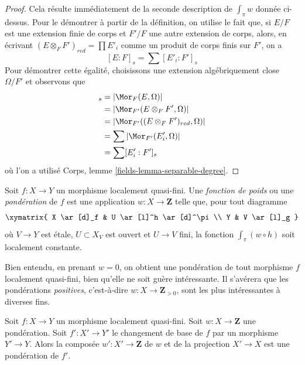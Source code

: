 \begin{proof}
Cela résulte immédiatement de la seconde description de $\int_\pi w$
donnée ci-dessus. Pour le démontrer à partir de la définition, on utilise le fait que, si
$E/F$ est une extension finie de corps et $F'/F$ une autre extension de corps,
alors, en écrivant $(E \otimes_F F')_{red} = \prod E'_i$ comme un produit de corps
finis sur $F'$, on a
$$
[E : F]_s = \sum [E'_i : F']_s
$$
Pour démontrer cette égalité, choisissons une extension algébriquement close
$\Omega/F'$ et observons que
\begin{align*}
[E : F]_s
& =
|\Mor_F(E, \Omega)| \\
& =
|\Mor_{F'}(E \otimes_F F', \Omega)| \\
& =
|\Mor_{F'}((E \otimes_F F')_{red}, \Omega)| \\
& =
\sum |\Mor_{F'}(E'_i, \Omega)| \\
& =
\sum [E'_i : F']_s
\end{align*}
où l'on a utilisé Corps, lemme \ref{fields-lemma-separable-degree}.
\end{proof}

\begin{definition}
\label{definition-weighting}
Soit $f : X \to Y$ un morphisme localement quasi-fini. Une
{\it fonction de poids} ou une {\it pond\'eration} de $f$ est une application
$w : X \to \mathbf{Z}$ telle que, pour tout diagramme
$$
\xymatrix{
X \ar[d]_f & U \ar[l]^h \ar[d]^\pi \\
Y & V \ar[l]_g
}
$$
où $V \to Y$ est \'etale, $U \subset X_V$ est ouvert et $U \to V$ fini,
la fonction $\int_\pi (w \circ h)$ soit localement constante.
\end{definition}

\noindent
Bien entendu, en prenant $w = 0$, on obtient une pondération de tout morphisme
$f$ localement quasi-fini, bien qu'elle ne soit guère intéressante. Il s'avérera que les
pondérations {\it positives}, c'est-à-dire $w : X \to \mathbf{Z}_{> 0}$, sont
les plus intéressantes à diverses fins.

\begin{lemma}
\label{lemma-weighting-base-change}
Soit $f : X \to Y$ un morphisme localement quasi-fini.
Soit $w : X \to \mathbf{Z}$ une pondération. Soit $f' : X' \to Y'$
le changement de base de $f$ par un morphisme $Y' \to Y$. Alors la
composée $w' : X' \to \mathbf{Z}$ de $w$ et de la projection $X' \to X$
est une pondération de $f'$.
\end{lemma}

